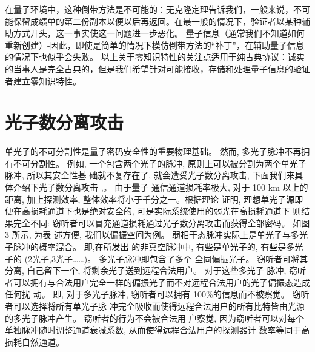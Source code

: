 在量子环境中，这种倒带方法是不可能的：无克隆定理告诉我们，一般来说，不可能保留成绩单的第二份副本以便以后再返回。在最一般的情况下，验证者以某种辅助方式开头，这一事实使这一问题进一步恶化。 量子信息（通常我们不知道如何重新创建）-因此，即使是简单的情况下模仿倒带方法的“补丁”，在辅助量子信息的情况下也似乎会失败。 以上关于零知识特性的关注点适用于纯古典协议：诚实的当事人是完全古典的，但是我们希望针对可能接收，存储和处理量子信息的验证者建立零知识特性。

\section{光子数分离攻击}
单光子的不可分割性是量子密码安全性的重要物理基础。 然而, 多光子脉冲不再拥有不可分割性。 例如, 一个包含两个光子的脉冲, 原则上可以被分割为两个单光子脉冲, 所以其安全性基 础就不复存在了, 就会遭受光子数分离攻击, 下面我们来具体介绍下光子数分离攻击 \cite{Huttner1995},\cite{Brassard2000}。 由于量子 通信通道损耗率极大, 对于 100 km 以上的距离, 加上探测效率, 整体效率将小于千分之一。根据理论 证明, 理想单光子源即便在高损耗通道下也是绝对安全的, 可是实际系统使用的弱光在高损耗通道下 则结果完全不同: 窃听者可以冒充通道损耗通过光子数分离攻击而获得全部密码。 如图 3 所示, 为表 述方便, 我们以偏振空间为例。 弱相干态脉冲实际上是单光子与多光子脉冲的概率混合。 即,在所发出 的非真空脉冲中, 有些是单光子的, 有些是多光子的 (2光子,3光子……)。 多光子脉冲即包含了多个 全同偏振光子。 窃听者可将其分离, 自己留下一个, 将剩余光子送到远程合法用户。 对于这些多光子 脉冲, 窃听者可以拥有与合法用户完全一样的偏振光子而不对远程合法用户的光子偏振态造成任何扰 动。 即, 对于多光子脉冲, 窃听者可以拥有 100\%的信息而不被察觉。 窃听者可以选择将所有单光子脉 冲完全吸收而使得远程合法用户的所有比特皆由光源的多光子脉冲产生。 窃听者的行为不会被合法用 户察觉, 因为窃听者可以对每个单独脉冲随时调整通道衰减系数, 从而使得远程合法用户的探测器计 数率等同于高损耗自然通道。

